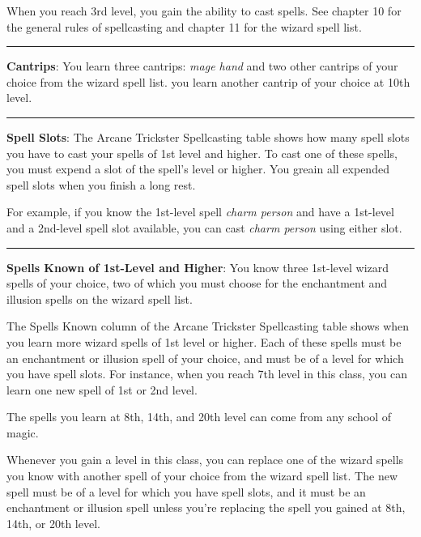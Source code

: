 \begin{multicols}{3}
{\scriptsize
When you reach 3rd level, you gain the ability to cast spells. See
chapter 10 for the general rules of spellcasting and chapter 11 for the
wizard spell list.\par
\vspace{1em}\hrule\vspace{1em}
\textbf{Cantrips}: You learn three cantrips: \textit{mage hand} and two
other cantrips of your choice from the wizard spell list. you learn
another cantrip of your choice at 10th level.
\vspace{1em}\hrule\vspace{1em}
\textbf{Spell Slots}: The Arcane Trickster Spellcasting table shows how
many spell slots you have to cast your spells of 1st level and higher.
To cast one of these spells, you must expend a slot of the spell's level
or higher. You greain all expended spell slots when you finish a long
rest.
\par
For example, if you know the 1st-level spell \textit{charm person} and
have a 1st-level and a 2nd-level spell slot available, you can cast
\textit{charm person} using either slot.
\vspace{1em}\hrule\vspace{1em}
\textbf{Spells Known of 1st-Level and Higher}: You know three 1st-level
wizard spells of your choice, two of which you must choose for the
enchantment and illusion spells on the wizard spell list.\par
The Spells Known column of the Arcane Trickster Spellcasting table shows
when you learn more wizard spells of 1st level or higher. Each of these
spells must be an enchantment or illusion spell of your choice, and must
be of a level for which you have spell slots. For instance, when you
reach 7th level in this class, you can learn one new spell of 1st or 2nd
level.\par
The spells you learn at 8th, 14th, and 20th level can come from any
school of magic.\par
Whenever you gain a level in this class, you can replace one of the
wizard spells you know with another spell of your choice from the
wizard spell list. The new spell must be of a level for which you have
spell slots, and it must be an enchantment or illusion spell unless
you're replacing the spell you gained at 8th, 14th, or 20th level.\par
} %
\end{multicols}
\par
